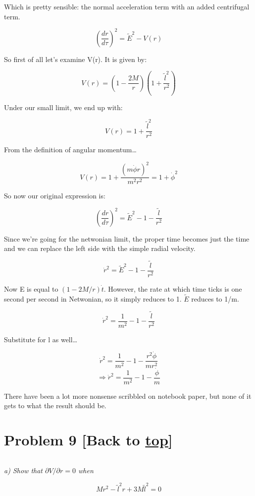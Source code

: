 \documentclass[landscape,letterpaper,10pt,english]{article}
\begin{document}
    Which is pretty sensible: the normal acceleration term with an added
centrifugal term.

\[\left( \frac{dr}{d\tau} \right)^2 = \tilde E^2 - V(r)\]

So first of all let's examine V(r). It is given by:

\[ V(r) = \left( 1-\frac{2M}{r} \right) \left( 1+\frac{\tilde l^2}{r^2} \right) \]

Under our small limit, we end up with:

\[ V(r) =  1+\frac{\tilde l^2}{r^2} \]

From the definition of angular momentum\ldots{}

\[ V(r) =  1+\frac{(m\dot\phi r)^2}{m^2r^2} = 1 + \dot\phi^2 \]

    So now our original expression is:

\[\left( \frac{dr}{d\tau} \right)^2 = \tilde E^2 - 1 - \frac{\tilde l}{r^2}\]

Since we're going for the netwonian limit, the proper time becomes just
the time and we can replace the left side with the simple radial
velocity.

\[\dot r^2 = \tilde E^2 - 1 - \frac{\tilde l}{r^2}\]

Now E is equal to \((1-2M/r)\dot t\). However, the rate at which time
ticks is one second per second in Netwonian, so it simply reduces to 1.
\(\tilde E\) reduces to 1/m.

\[\dot r^2 = \frac{1}{m^2} - 1 - \frac{\tilde l}{r^2}\]

Substitute for l as well\ldots{}

\[\dot r^2 = \frac{1}{m^2} - 1 - \frac{r^2\dot \phi}{mr^2}\]
\[\Rightarrow \dot r^2 = \frac{1}{m^2} - 1 - \frac{\dot \phi}{m}\]

    There have been a lot more nonsense scribbled on notebook paper, but
none of it gets to what the result should be.

    \hypertarget{problem-9-back-to-top}{%
\section{\texorpdfstring{Problem 9 {[}Back to
\hyperref[toc]{top}{]}}{Problem 9 {[}Back to {]}}}\label{problem-9-back-to-top}}

\[\label{P9}\]

\emph{a) Show that \(\partial V / \partial r = 0\) when}

\[ Mr^2 - \tilde l^2 r + 3M \tilde l^2 = 0 \]
\end{document}

